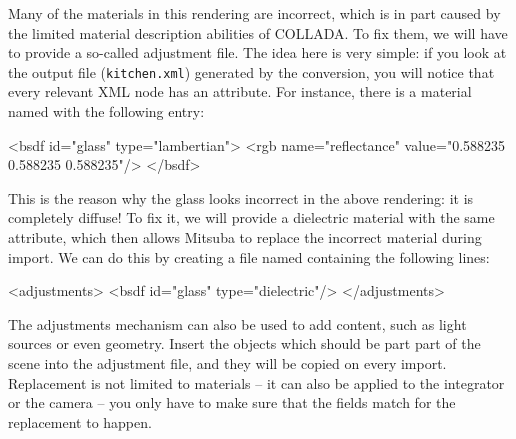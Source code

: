 \begin{center}
\end{center}
Many of the materials in this rendering are incorrect, which is in part caused by the limited material description abilities of COLLADA.
To fix them, we will have to provide a so-called adjustment file. The idea here is very simple: if you look at the output file (\texttt{kitchen.xml}) 
generated by the conversion, you will notice that every relevant XML node has an  attribute. For instance, there is a material named  with the following entry:
\begin{xml}
<bsdf id="glass" type="lambertian">
	<rgb name="reflectance" value="0.588235 0.588235 0.588235"/>
</bsdf>
\end{xml}
\newpage
This is the reason why the glass looks incorrect in the above rendering: it is completely diffuse!
To fix it, we will provide a dielectric material with the same  attribute, which then allows Mitsuba
to replace the incorrect material during import.
We can do this by creating a file named  containing
the following lines:
\begin{xml}
<adjustments>
	<bsdf id="glass" type="dielectric"/>
</adjustments>
\end{xml}
The adjustments mechanism can also be used to add content, such as light sources or even geometry. Insert the objects which should
be part part of the scene into the adjustment file, and they will be copied on every import. Replacement is not limited to materials -- it
can also be applied to the integrator or the camera -- you only have to make sure that the  fields match for the replacement to happen.

